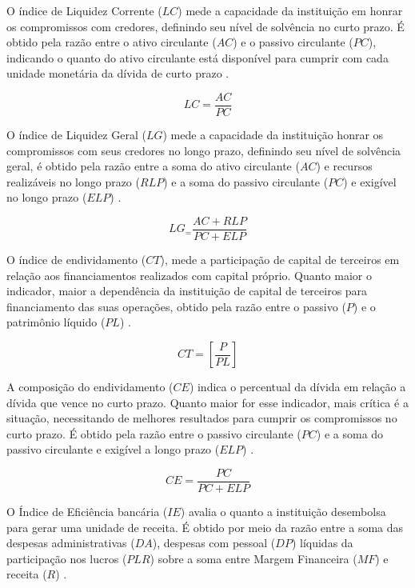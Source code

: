 \documentclass[
  12pt,
  12pt,
  openright,
  oneside,
  a4paper,
  chapter=TITLE,
  section=TITLE,
  subsection=TITLE,
  subsubsection=TITLE,
  portugues,
  sumario=tradicional]{abntex2}
\begin{document}
O índice de Liquidez Corrente (\(LC\)) mede a capacidade da instituição em honrar os compromissos com credores, definindo seu nível de solvência no curto prazo. É obtido pela razão entre o ativo circulante (\(AC\)) e o passivo circulante (\(PC\)), indicando o quanto do ativo circulante está disponível para cumprir com cada unidade monetária da dívida de curto prazo \cite{graham:2012} \cite{assaf:2020}.

\begin{equation}
LC = \frac{AC}{PC}
\end{equation}

O índice de Liquidez Geral (\(LG\)) mede a capacidade da instituição honrar os compromissos com seus credores no longo prazo, definindo seu nível de solvência geral, é obtido pela razão entre a soma do ativo circulante (\(AC\)) e recursos realizáveis no longo prazo (\(RLP\)) e a soma do passivo circulante (\(PC\)) e exigível no longo prazo (\(ELP\)) \cite{assaf:2020}.

\begin{equation}
LG_ = \frac{AC + RLP}{PC + ELP}
\end{equation}

O índice de endividamento (\(CT\)), mede a participação de capital de terceiros em relação aos financiamentos realizados com capital próprio. Quanto maior o indicador, maior a dependência da instituição de capital de terceiros para financiamento das suas operações, obtido pela razão entre o passivo (\(P\)) e o patrimônio líquido (\(PL\)) \cite{assaf:2020}.

\begin{equation}
CT = [\frac{P}{PL}]
\end{equation}

A composição do endividamento (\(CE\)) indica o percentual da dívida em relação a dívida que vence no curto prazo. Quanto maior for esse indicador, mais crítica é a situação, necessitando de melhores resultados para cumprir os compromissos no curto prazo. É obtido pela razão entre o passivo circulante (\(PC\)) e a soma do passivo circulante e exigível a longo prazo (\(ELP\)) \cite{assaf:2020}.

\begin{equation}
CE = \frac{PC}{PC + ELP}
\end{equation}

O Índice de Eficiência bancária (\(IE\)) avalia o quanto a instituição desembolsa para gerar uma unidade de receita. É obtido por meio da razão entre a soma das despesas administrativas (\(DA\)), despesas com pessoal (\(DP\)) líquidas da participação nos lucros (\(PLR\)) sobre a soma entre Margem Financeira (\(MF\)) e receita (\(R\)) \cite{timotio:2018}.
\end{document}
